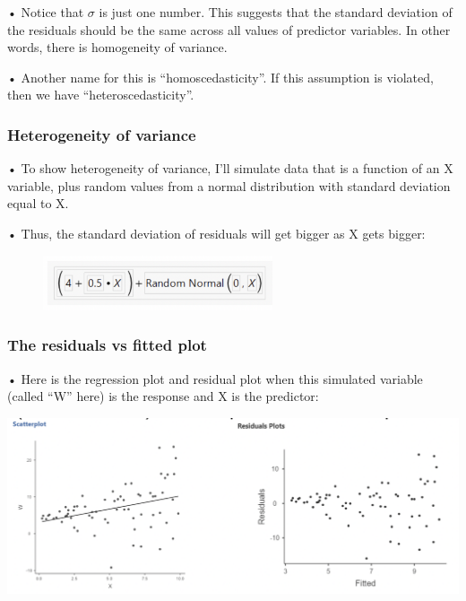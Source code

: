 \documentclass[
  letterpaper,
  DIV=11,
  numbers=noendperiod]{scrreprt}
\begin{document}
• Notice that \(\sigma\) is just one number. This suggests that the
standard deviation of the residuals should be the same across all values
of predictor variables. In other words, there is homogeneity of
variance.

• Another name for this is ``homoscedasticity''. If this assumption is
violated, then we have ``heteroscedasticity''.

\hypertarget{heterogeneity-of-variance}{%
\subsubsection{Heterogeneity of
variance}\label{heterogeneity-of-variance}}

• To show heterogeneity of variance, I'll simulate data that is a
function of an X variable, plus random values from a normal distribution
with standard deviation equal to X.

• Thus, the standard deviation of residuals will get bigger as X gets
bigger:

\begin{figure}

{\centering \includegraphics[width=2.66667in,height=\textheight]{images/mod4_pt1_15.png}

}

\end{figure}

\hypertarget{the-residuals-vs-fitted-plot}{%
\subsubsection{The residuals vs fitted
plot}\label{the-residuals-vs-fitted-plot}}

• Here is the regression plot and residual plot when this simulated
variable (called ``W'' here) is the response and X is the predictor:

\includegraphics{images/mod4_pt1_16.png}
\end{document}
